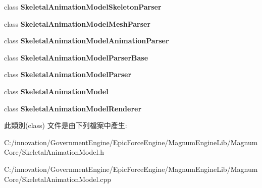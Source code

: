 \begin{DoxyCompactItemize}
\item 
class {\bfseries Skeletal\+Animation\+Model\+Skeleton\+Parser}\hypertarget{class_i_dream_sky_1_1_skeletal_animation_model_1_1_animation_a14bd27cfabbcaeaa0eccce0e2968a6a1}{}\label{class_i_dream_sky_1_1_skeletal_animation_model_1_1_animation_a14bd27cfabbcaeaa0eccce0e2968a6a1}

\item 
class {\bfseries Skeletal\+Animation\+Model\+Mesh\+Parser}\hypertarget{class_i_dream_sky_1_1_skeletal_animation_model_1_1_animation_a85398ce1e5e5023cd13165515f7cfbfa}{}\label{class_i_dream_sky_1_1_skeletal_animation_model_1_1_animation_a85398ce1e5e5023cd13165515f7cfbfa}

\item 
class {\bfseries Skeletal\+Animation\+Model\+Animation\+Parser}\hypertarget{class_i_dream_sky_1_1_skeletal_animation_model_1_1_animation_ade6e25226df119aaa0de3f45d908a551}{}\label{class_i_dream_sky_1_1_skeletal_animation_model_1_1_animation_ade6e25226df119aaa0de3f45d908a551}

\item 
class {\bfseries Skeletal\+Animation\+Model\+Parser\+Base}\hypertarget{class_i_dream_sky_1_1_skeletal_animation_model_1_1_animation_a11930f7450c30641e8526b073100f760}{}\label{class_i_dream_sky_1_1_skeletal_animation_model_1_1_animation_a11930f7450c30641e8526b073100f760}

\item 
class {\bfseries Skeletal\+Animation\+Model\+Parser}\hypertarget{class_i_dream_sky_1_1_skeletal_animation_model_1_1_animation_a472cd974e223ab8bf1063fc39c8a7d43}{}\label{class_i_dream_sky_1_1_skeletal_animation_model_1_1_animation_a472cd974e223ab8bf1063fc39c8a7d43}

\item 
class {\bfseries Skeletal\+Animation\+Model}\hypertarget{class_i_dream_sky_1_1_skeletal_animation_model_1_1_animation_a40c4f607e5b71602c57777a29d5b4d31}{}\label{class_i_dream_sky_1_1_skeletal_animation_model_1_1_animation_a40c4f607e5b71602c57777a29d5b4d31}

\item 
class {\bfseries Skeletal\+Animation\+Model\+Renderer}\hypertarget{class_i_dream_sky_1_1_skeletal_animation_model_1_1_animation_a9a80d2b83f1f7bd922df78f21ee526db}{}\label{class_i_dream_sky_1_1_skeletal_animation_model_1_1_animation_a9a80d2b83f1f7bd922df78f21ee526db}

\end{DoxyCompactItemize}


此類別(class) 文件是由下列檔案中產生\+:\begin{DoxyCompactItemize}
\item 
C\+:/innovation/\+Government\+Engine/\+Epic\+Force\+Engine/\+Magnum\+Engine\+Lib/\+Magnum\+Core/Skeletal\+Animation\+Model.\+h\item 
C\+:/innovation/\+Government\+Engine/\+Epic\+Force\+Engine/\+Magnum\+Engine\+Lib/\+Magnum\+Core/Skeletal\+Animation\+Model.\+cpp\end{DoxyCompactItemize}

